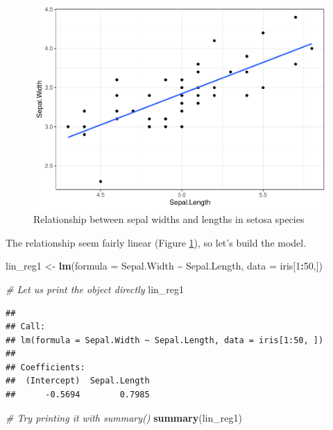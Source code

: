 \documentclass[
]{book}
\newenvironment{Shaded}{\begin{snugshade}}{\end{snugshade}}
\newcommand{\AttributeTok}[1]{\textcolor[rgb]{0.13,0.29,0.53}{#1}}
\newcommand{\CommentTok}[1]{\textcolor[rgb]{0.56,0.35,0.01}{\textit{#1}}}
\newcommand{\DecValTok}[1]{\textcolor[rgb]{0.00,0.00,0.81}{#1}}
\newcommand{\FunctionTok}[1]{\textcolor[rgb]{0.13,0.29,0.53}{\textbf{#1}}}
\newcommand{\NormalTok}[1]{#1}
\newcommand{\OtherTok}[1]{\textcolor[rgb]{0.56,0.35,0.01}{#1}}
\newcommand{\SpecialCharTok}[1]{\textcolor[rgb]{0.81,0.36,0.00}{\textbf{#1}}}
\begin{document}
\begin{figure}

{\centering \includegraphics[height=0.3\textheight]{DauR_files/figure-latex/ex1plot-1} 

}

\caption{Relationship between sepal widths and lengths in setosa species}\label{fig:ex1plot}
\end{figure}

The relationship seem fairly linear (Figure \ref{fig:ex1plot}), so let's build the model.

\begin{Shaded}
\begin{Highlighting}[]
\NormalTok{lin\_reg1 }\OtherTok{\textless{}{-}} \FunctionTok{lm}\NormalTok{(}\AttributeTok{formula =}\NormalTok{ Sepal.Width }\SpecialCharTok{\textasciitilde{}}\NormalTok{ Sepal.Length, }\AttributeTok{data =}\NormalTok{ iris[}\DecValTok{1}\SpecialCharTok{:}\DecValTok{50}\NormalTok{,])}

\CommentTok{\# Let us print the object directly}
\NormalTok{lin\_reg1}
\end{Highlighting}
\end{Shaded}

\begin{verbatim}
## 
## Call:
## lm(formula = Sepal.Width ~ Sepal.Length, data = iris[1:50, ])
## 
## Coefficients:
##  (Intercept)  Sepal.Length  
##      -0.5694        0.7985
\end{verbatim}

\begin{Shaded}
\begin{Highlighting}[]
\CommentTok{\# Try printing it with summary()}
\FunctionTok{summary}\NormalTok{(lin\_reg1)}
\end{Highlighting}
\end{Shaded}
\end{document}
